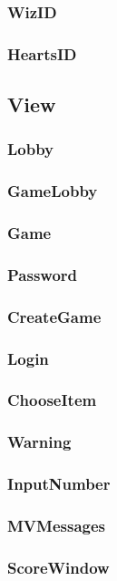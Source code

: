 \documentclass{article}
\begin{document}
\subsubsection{WizID}
\subsubsection{HeartsID}
\newpage

\subsection{View}
\subsubsection{Lobby}
\subsubsection{GameLobby}
\subsubsection{Game}
\subsubsection{Password}
\subsubsection{CreateGame}
\subsubsection{Login}
\subsubsection{ChooseItem}
\subsubsection{Warning}
\subsubsection{InputNumber}
\subsubsection{MVMessages}
\subsubsection{ScoreWindow}
\end{document}
